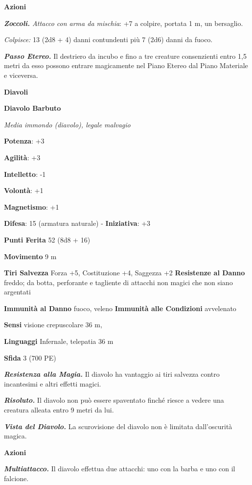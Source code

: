 \begin{multicols}{2}
\smallskip\textbf{Azioni}

\emph{\textbf{Zoccoli.} Attacco con arma da mischia}: +7 a colpire,
portata 1 m, un bersaglio.

\emph{Colpisce:} 13 (2d8 + 4) danni contundenti più 7 (2d6) danni da
fuoco.

\emph{\textbf{Passo Etereo.}} Il destriero da incubo e fino a tre
creature consenzienti entro 1,5 metri da esso possono entrare
magicamente nel Piano Etereo dal Piano Materiale e viceversa.

\textbf{Diavoli}

\textbf{Diavolo Barbuto}

\emph{Media immondo (diavolo), legale malvagio}

\textbf{Potenza}: +3

\textbf{Agilità}: +3

\textbf{Intelletto}: -1

\textbf{Volontà}: +1

\textbf{Magnetismo}: +1

\textbf{Difesa}: 15 (armatura naturale) - \textbf{Iniziativa}: +3

\textbf{Punti Ferita} 52 (8d8 + 16)

\textbf{Movimento} 9 m

\textbf{Tiri Salvezza} Forza +5, Costituzione +4, Saggezza +2
\textbf{Resistenze al Danno} freddo; da botta, perforante e tagliente
di attacchi non magici che non siano argentati

\textbf{Immunità al Danno} fuoco, veleno \textbf{Immunità alle
Condizioni} avvelenato

\textbf{Sensi} visione crepuscolare 36 m, 

\textbf{Linguaggi} Infernale, telepatia 36 m 

\textbf{Sfida} 3 (700 PE)\smallskip

\emph{\textbf{Resistenza alla Magia.}} Il diavolo ha vantaggio ai tiri
salvezza contro incantesimi e altri effetti magici.

\emph{\textbf{Risoluto.}} Il diavolo non può essere spaventato finché
riesce a vedere una creatura alleata entro 9 metri da lui.

\emph{\textbf{Vista del Diavolo.}} La scurovisione del diavolo non è
limitata dall'oscurità magica.

\smallskip\textbf{Azioni}

\emph{\textbf{Multiattacco.}} Il diavolo effettua due attacchi: uno con
la barba e uno con il falcione.


\end{multicols}
